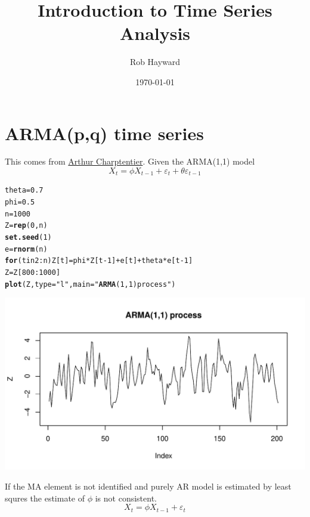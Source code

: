 \documentclass[12pt, a4paper, oneside]{article}\usepackage[]{graphicx}\usepackage[]{color}
\makeatletter
\def\maxwidth{ %
  \ifdim\Gin@nat@width>\linewidth
    \linewidth
  \else
    \Gin@nat@width
  \fi
}
\newcommand{\hlstr}[1]{\textcolor[rgb]{0.192,0.494,0.8}{#1}}%
\newcommand{\hlkwd}[1]{\textcolor[rgb]{0.737,0.353,0.396}{\textbf{#1}}}%
\newenvironment{kframe}{%
 \def\at@end@of@kframe{}%
 \ifinner\ifhmode%
  \def\at@end@of@kframe{\end{minipage}}%
  \begin{minipage}{\columnwidth}%
 \fi\fi%
 \def\FrameCommand##1{\hskip\@totalleftmargin \hskip-\fboxsep
 \colorbox{shadecolor}{##1}\hskip-\fboxsep
     \hskip-\linewidth \hskip-\@totalleftmargin \hskip\columnwidth}%
 \MakeFramed {\advance\hsize-\width
   \@totalleftmargin\z@ \linewidth\hsize
   \@setminipage}}%
 {\par\unskip\endMakeFramed%
 \at@end@of@kframe}
\newenvironment{knitrout}{}{} %
\makeatother
\begin{document}
\title{Introduction to Time Series Analysis}
\author{Rob Hayward}
\date{\today}
\maketitle


\section{ARMA(p,q) time series}
This comes from \href{http://freakonometrics.hypotheses.org/12217}{Arthur Charptentier}.  Given the ARMA(1,1) model
\begin{equation}
X_t = \phi X_{t-1} + \varepsilon_t + \theta \varepsilon_{t-1}
\end{equation}

\begin{knitrout}
\color{fgcolor}\begin{kframe}
\begin{alltt}
theta = 0.7
phi = 0.5
n = 1000
Z = \hlkwd{rep}(0, n)
\hlkwd{set.seed}(1)
e = \hlkwd{rnorm}(n)
\hlkwd{for} (t in 2:n) Z[t] = phi * Z[t - 1] + e[t] + theta * e[t - 1]
Z = Z[800:1000]
\hlkwd{plot}(Z, type = \hlstr{"l"}, main = \hlstr{"\hlkwd{ARMA}(1,1) process"})
\end{alltt}
\end{kframe}
\includegraphics[width=\maxwidth]{figure/MA} 

\end{knitrout}

If the MA element is not identified and purely AR model is estimated by least squres the estimate of $\phi$ is not consistent. 
\begin{equation}
X_t = \phi X_{t-1} + \varepsilon_t
\end{equation}
\end{document}
